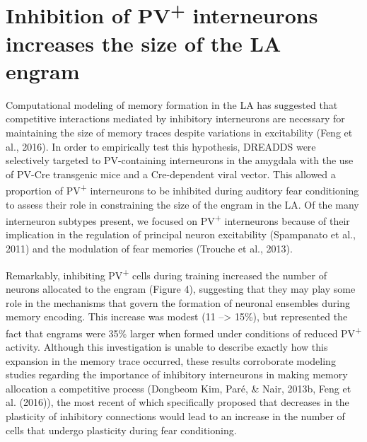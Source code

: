 \documentclass[12pt,a4paper,]{report}
\begin{document}
\section{\texorpdfstring{Inhibition of PV\textsuperscript{+}
interneurons increases the size of the LA
engram}{Inhibition of PV+ interneurons increases the size of the LA engram}}\label{inhibition-of-pv-interneurons-increases-the-size-of-the-la-engram}

Computational modeling of memory formation in the LA has suggested that
competitive interactions mediated by inhibitory interneurons are
necessary for maintaining the size of memory traces despite variations
in excitability (Feng et al., 2016). In order to empirically test this
hypothesis, DREADDS were selectively targeted to PV-containing
interneurons in the amygdala with the use of PV-Cre transgenic mice and
a Cre-dependent viral vector. This allowed a proportion of
PV\textsuperscript{+} interneurons to be inhibited during auditory fear
conditioning to assess their role in constraining the size of the engram
in the LA. Of the many interneuron subtypes present, we focused on
PV\textsuperscript{+} interneurons because of their implication in the
regulation of principal neuron excitability (Spampanato et al., 2011)
and the modulation of fear memories (Trouche et al., 2013).

Remarkably, inhibiting PV\textsuperscript{+} cells during training
increased the number of neurons allocated to the engram (Figure 4),
suggesting that they may play some role in the mechanisms that govern
the formation of neuronal ensembles during memory encoding. This
increase was modest (11 --\textgreater{} 15\%), but represented the fact
that engrams were 35\% larger when formed under conditions of reduced
PV\textsuperscript{+} activity. Although this investigation is unable to
describe exactly how this expansion in the memory trace occurred, these
results corroborate modeling studies regarding the importance of
inhibitory interneurons in making memory allocation a competitive
process (Dongbeom Kim, Paré, \& Nair, 2013b, Feng et al. (2016)), the
most recent of which specifically proposed that decreases in the
plasticity of inhibitory connections would lead to an increase in the
number of cells that undergo plasticity during fear conditioning.
\end{document}
